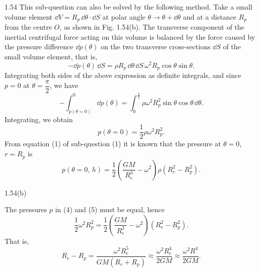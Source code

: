 \begin{solution}{1.54}
This sub-question can also be solved by the following method. Take a small volume element $\dd V=R_p\,\dd\theta\cdot\dd S$ at polar angle $\theta\to\theta+\dd\theta$ and at a distance $R_p$ from the centre $O$, as shown in Fig. 1.54(b). The transverse component of the inertial centrifugal force acting on this volume is balanced by the force caused by the pressure difference $\dd p(\theta)$ on the two transverse cross-sections $\dd S$ of the small volume element, that is,
\[
-\dd p(\theta)\,\dd S=\rho R_p\,\dd\theta\,\dd S\,\omega^2R_p\cos\theta\sin\theta.
\]
Integrating both sides of the above expression as definite integrals, and since $p=0$ at $\theta=\dfrac{\pi}{2}$, we have
\[
-\int_{p(\theta=0)}^{0}\dd p(\theta)=\int_{0}^{\frac{\pi}{2}}\rho\omega^2R_p^2\sin\theta\cos\theta\,\dd\theta.
\]
Integrating, we obtain
\begin{equation}
p(\theta=0)=\frac{1}{2}\rho\omega^2R_p^2. \tag{4}
\end{equation}
From equation (1) of sub-question (1) it is known that the pressure at $\theta=0$, $r=R_p$ is
\begin{equation}
p(\theta=0,\,h)=\frac{1}{2}\left(\frac{GM}{R_e^3}-\omega^2\right)\rho\left(R_e^2-R_p^2\right). \tag{5}
\end{equation}

\begin{figbox}{1.54(b)}
\end{figbox}

The pressures $p$ in (4) and (5) must be equal, hence
\[
\frac{1}{2}\omega^2R_p^2=\frac{1}{2}\left(\frac{GM}{R_e^3}-\omega^2\right)\left(R_e^2-R_p^2\right).
\]
That is,
\begin{equation}
R_e-R_p=\frac{\omega^2R_e^5}{GM\left(R_e+R_p\right)}\approx\frac{\omega^2R_e^4}{2GM}\approx\frac{\omega^2R^4}{2GM}. \tag{6}
\end{equation}
\end{solution}

